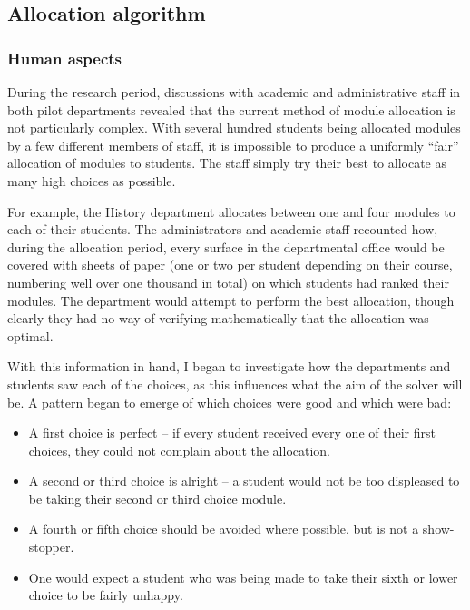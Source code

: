 
\subsection{Allocation algorithm}


\subsubsection{Human aspects}
\label{sec:algo_humanaspects}

During the research period, discussions with academic and administrative staff
in both pilot departments revealed that the current method of module
allocation is not particularly complex. With several hundred students being
allocated modules by a few different members of staff, it is impossible to
produce a uniformly ``fair'' allocation of modules to students. The staff
simply try their best to allocate as many high choices as possible.

For example, the History department allocates between one and four modules to
each of their students. The administrators and academic staff recounted how,
during the allocation period, every surface in the departmental office would
be covered with sheets of paper (one or two per student depending on their
course, numbering well over one thousand in total) on which students had
ranked their modules. The department would attempt to perform the best
allocation, though clearly they had no way of verifying mathematically that
the allocation was optimal.

With this information in hand, I began to investigate how the departments and
students saw each of the choices, as this influences what the aim of the
solver will be. A pattern began to emerge of which choices were good and which
were bad:

\begin{itemize}
  \item A first choice is perfect -- if every student received every one of
        their first choices, they could not complain about the allocation.
  \item A second or third choice is alright -- a student would not be too
        displeased to be taking their second or third choice module.
  \item A fourth or fifth choice should be avoided where possible, but is not
        a show-stopper.
  \item One would expect a student who was being made to take their sixth or
        lower choice to be fairly unhappy.
\end{itemize}

